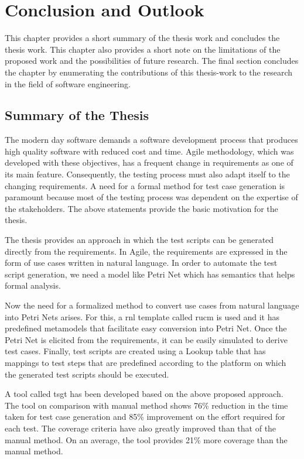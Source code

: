 
\chapter{Conclusion and Outlook}\label{conclusion} 
This chapter provides a short summary of the thesis work and concludes the thesis work. This chapter also provides a short note on the limitations of the proposed work and the possibilities of future research. The final section concludes the chapter by enumerating the contributions of this thesis-work to the research in the field of software engineering.

\section{Summary of the Thesis}
The modern day software demands a software development process that produces high quality software with reduced cost and time.  Agile methodology, which was developed with these objectives, has a frequent change in requirements as one of its main feature. Consequently, the testing process must also adapt itself to the changing requirements. A need for a formal method for test case generation is paramount because most of the testing process was dependent on the expertise of the stakeholders. The above statements provide the basic motivation for the thesis.

The thesis provides an approach in which the test scripts can be generated directly from the requirements. In Agile, the requirements are expressed in the form of use cases written in natural language. In order to automate the test script generation, we need a model like Petri Net which has semantics that helps formal analysis. 

Now the need for a formalized method to convert use cases from natural language into Petri Nets arises. For this, a \gls{rnl} template called \gls{rucm} is used and it has predefined metamodels that facilitate easy conversion into Petri Net. Once the Petri Net is elicited from the requirements, it can be easily simulated to derive test cases. Finally, test scripts are created using a Lookup table that has mappings to test steps that are predefined according to the platform on which the generated test scripts should be executed. 

A tool called \gls{tsgt} has been developed based on the above proposed approach. The tool on comparison with manual method shows 76\% reduction in the time taken for test case generation and 85\% improvement on the effort required for each test. The coverage criteria have also greatly improved than that of the manual method. On an average, the tool provides 21\% more coverage than the manual method.


